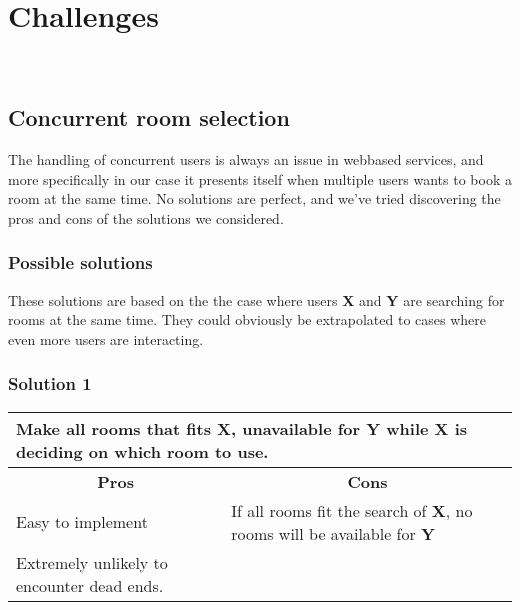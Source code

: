 
\section{Challenges}
\label{sec:challenges}
\\
\subsection{Concurrent room selection}
The handling of concurrent users is always an issue in webbased services, and more specifically in our case it presents itself when multiple users wants to book a room at the same time. No solutions are perfect, and we've tried discovering the pros and cons of the solutions we considered.

\subsubsection*{Possible solutions}
These solutions are based on the the case where users \textbf{X} and \textbf{Y} are searching for rooms at the same time. They could obviously be extrapolated to cases where even more users are interacting. 
\subsubsection*{Solution 1}
\begin{tabular}{|p{6cm}|p{6cm}|}
\hline 
	\multicolumn{2}{|p{12cm}|}{Make all rooms that fits \textbf{X}, unavailable for \textbf{Y} while \textbf{X} is deciding on which room to use.} \\ \hline \hline
	\multicolumn{1}{|c|}{\textbf{Pros}} & \multicolumn{1}{c|}{\textbf{Cons}} \\ \hline
	Easy to implement & If all rooms fit the search of \textbf{X}, no rooms will be available for \textbf{Y} \\ \hline
	Extremely unlikely to encounter dead ends. & \\
	\hline
\end{tabular}
\\
